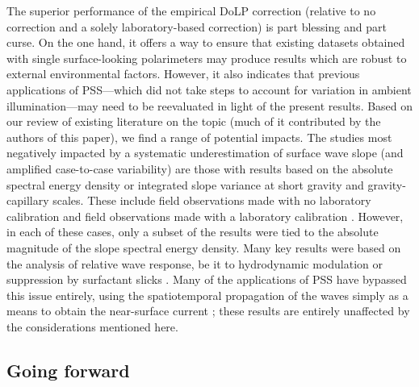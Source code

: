 \documentclass[letterpaper,journal]{IEEEtran}
\begin{document}
The superior performance of the empirical DoLP correction (relative to no correction and a solely laboratory-based correction) is part blessing and part curse. On the one hand, it offers a way to ensure that existing datasets obtained with single surface-looking polarimeters may produce results which are robust to external environmental factors. However, it also indicates that previous applications of PSS---which did not take steps to account for variation in ambient illumination---may need to be reevaluated in light of the present results. Based on our review of existing literature on the topic (much of it contributed by the authors of this paper), we find a range of potential impacts. The studies most negatively impacted by a systematic underestimation of surface wave slope (and amplified case-to-case variability) are those with results based on the absolute spectral energy density or integrated slope variance at short gravity and gravity-capillary scales. These include field observations made with no laboratory calibration \cite{Laxague2015} and field observations made with a laboratory calibration \cite{Zappa2012,Laxague2018b}. However, in each of these cases, only a subset of the results were tied to the absolute magnitude of the slope spectral energy density. Many key results were based on the analysis of relative wave response, be it to hydrodynamic modulation \cite{Laxague2017a} or suppression by surfactant slicks \cite{laxague_suppression_2024}. Many of the applications of PSS have bypassed this issue entirely, using the spatiotemporal propagation of the waves simply as a means to obtain the near-surface current \cite{laxague2017b,Laxague2018a,Laxague2020a,Laxague2020b}; these results are entirely unaffected by the considerations mentioned here.

\subsection{Going forward}
\label{sec:forward}
\end{document}
